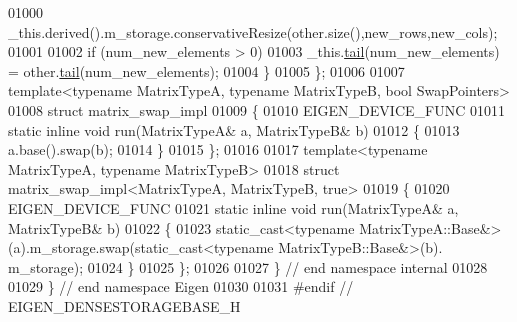 \begin{DoxyCode}
01000     \_this.derived().m\_storage.conservativeResize(other.size(),new\_rows,new\_cols);
01001 
01002     \textcolor{keywordflow}{if} (num\_new\_elements > 0)
01003       \_this.\hyperlink{group___core___module_aec3cf8f4f73c641d21a2c080c3e59662}{tail}(num\_new\_elements) = other.\hyperlink{group___core___module_aec3cf8f4f73c641d21a2c080c3e59662}{tail}(num\_new\_elements);
01004   \}
01005 \};
01006 
01007 \textcolor{keyword}{template}<\textcolor{keyword}{typename} MatrixTypeA, \textcolor{keyword}{typename} MatrixTypeB, \textcolor{keywordtype}{bool} SwapPo\textcolor{keywordtype}{int}ers>
01008 \textcolor{keyword}{struct }matrix\_swap\_impl
01009 \{
01010   EIGEN\_DEVICE\_FUNC
01011   \textcolor{keyword}{static} \textcolor{keyword}{inline} \textcolor{keywordtype}{void} run(MatrixTypeA& a, MatrixTypeB& b)
01012   \{
01013     a.base().swap(b);
01014   \}
01015 \};
01016 
01017 \textcolor{keyword}{template}<\textcolor{keyword}{typename} MatrixTypeA, \textcolor{keyword}{typename} MatrixTypeB>
01018 \textcolor{keyword}{struct }matrix\_swap\_impl<MatrixTypeA, MatrixTypeB, true>
01019 \{
01020   EIGEN\_DEVICE\_FUNC
01021   \textcolor{keyword}{static} \textcolor{keyword}{inline} \textcolor{keywordtype}{void} run(MatrixTypeA& a, MatrixTypeB& b)
01022   \{
01023     \textcolor{keyword}{static\_cast<}typename MatrixTypeA::Base&\textcolor{keyword}{>}(a).m\_storage.swap(static\_cast<typename MatrixTypeB::Base&>(b).
      m\_storage);
01024   \}
01025 \};
01026 
01027 \} \textcolor{comment}{// end namespace internal}
01028 
01029 \} \textcolor{comment}{// end namespace Eigen}
01030 
01031 \textcolor{preprocessor}{#endif // EIGEN\_DENSESTORAGEBASE\_H}
\end{DoxyCode}
